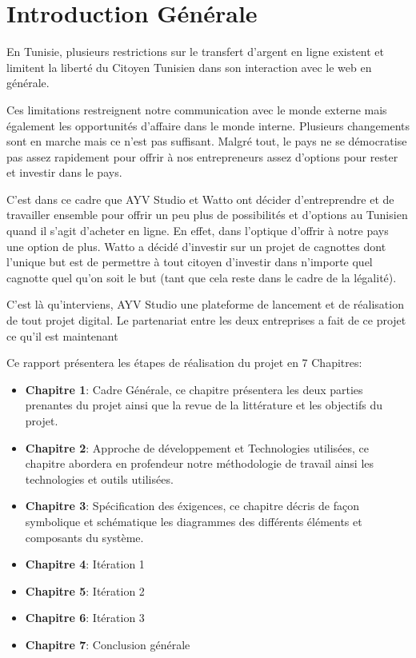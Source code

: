 \documentclass[../main.tex]{subfiles}
\begin{document}
\newpage
{}
\section*{Introduction Générale}
En Tunisie, plusieurs restrictions sur le transfert d'argent en ligne existent et limitent la liberté du Citoyen Tunisien dans son interaction avec le web en générale. 

Ces limitations restreignent notre communication avec le monde externe mais également les opportunités d'affaire dans le monde interne. Plusieurs changements sont en marche mais ce n'est pas suffisant. Malgré tout, le pays ne se démocratise pas assez rapidement pour offrir à nos entrepreneurs assez d'options pour rester et investir dans le pays. 

C'est dans ce cadre que AYV Studio et Watto ont décider d'entreprendre et de travailler ensemble pour offrir un peu plus de possibilités et d'options au Tunisien quand il s'agit d'acheter en ligne. En effet, dans l'optique d'offrir à notre pays une option de plus. Watto a décidé d'investir sur un projet de cagnottes dont l'unique but est de permettre à tout citoyen d'investir dans n'importe quel cagnotte quel qu'on soit le but (tant que cela reste dans le cadre de la légalité). 

\vspace{10pt}
\newline
C'est là qu'interviens, AYV Studio une plateforme de lancement et de réalisation de tout projet digital. Le partenariat entre les deux entreprises a fait de ce projet ce qu'il est maintenant 

\newline Ce rapport présentera les étapes de réalisation du projet en 7 Chapitres:
\begin{itemize}
  \item \textbf{Chapitre 1}: Cadre Générale, ce chapitre présentera les deux parties prenantes du projet ainsi que la revue de la littérature et les objectifs du projet.
    \item \textbf{Chapitre 2}: Approche de développement et Technologies utilisées, ce chapitre abordera en profendeur notre méthodologie de travail ainsi les technologies et outils utilisées.
    \item \textbf{Chapitre 3}: Spécification des éxigences, ce chapitre décris de façon symbolique et schématique les diagrammes des différents éléments et composants du système.
    \item \textbf{Chapitre 4}: Itération 1
    \item \textbf{Chapitre 5}: Itération 2
    \item \textbf{Chapitre 6}: Itération 3
    \item \textbf{Chapitre 7}: Conclusion générale
\end{itemize}
\end{document}
